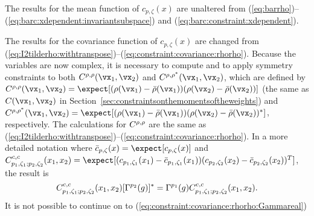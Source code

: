 \par
The results for the mean function of $c_{p,\zeta}(x)$ are unaltered from
(\ref{eq:barrho})--(\ref{eq:barc:xdependent:invariantsubspace}) and
(\ref{eq:barc:constraint:xdependent}).
\par
The results for the covariance function of $c_{p,\zeta}(x)$ are changed
from
(\ref{eq:I2tilderho:withtranspose})--(\ref{eq:constraint:covariance:rhorho}).
Because the variables are now complex, it is necessary to compute and to
apply symmetry constraints to both
$\Crhorho(\vx_1,\vx_2)$ and $\Crhorhoconj(\vx_1,\vx_2)$, which
are defined by
$\Crhorho(\vx_1,\vx_2)=\expect[(\rho(\vx_1)-\bar\rho(\vx_1))(\rho(\vx_2)-\bar\rho(\vx_2))]$
(the same as $\CrhoREAL(\vx_1,\vx_2)$ in Section~\ref{sec:constraintsonthemomentsoftheweights})
and
$\Crhorhoconj(\vx_1,\vx_2)=\expect[(\rho(\vx_1)-\bar\rho(\vx_1))(\rho(\vx_2)-\bar\rho(\vx_2))^\ast]$,
respectively.
The calculations for $C^{\rho,\rho}$ are the same as
(\ref{eq:I2tilderho:withtranspose})--(\ref{eq:constraint:covariance:rhorho}).
In a more detailed notation where
$\bar c_{p,\zeta}(x)=\expect[c_{p,\zeta}(x)]$
and
$\Ccc(x_1,x_2)=\expect[(c_{p_1,\zeta_1}(x_1)-\bar c_{p_1,\zeta_1}(x_1))
(c_{p_2,\zeta_2}(x_2)-\bar c_{p_2,\zeta_2}(x_2))^T]$,
the result is
\begin{equation}
C_{p_1,\zeta_1;p_2,\zeta_2}^{c,c}(x_1,x_2)
[\Gamma^{p_2}(g)]^\ast
=
\Gamma^{p_1}(g)
C_{p_1,\zeta_1;p_2,\zeta_2}^{c,c}(x_1,x_2)
\label{eq:constraint:covariance:rhorho:2}
.
\end{equation}
It is not possible to continue on to
(\ref{eq:constraint:covariance:rhorho:Gammareal}) %
